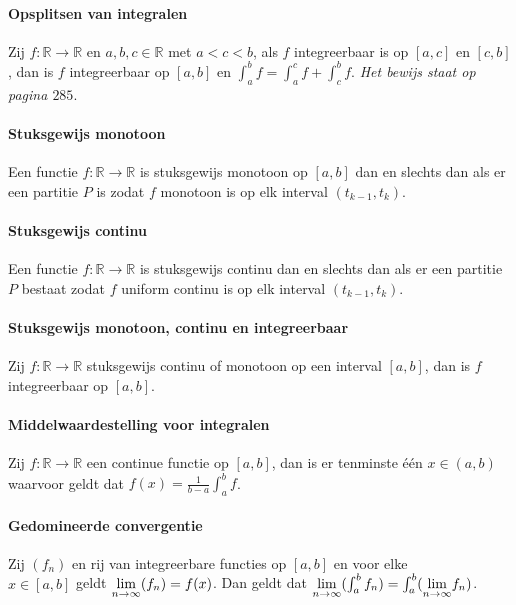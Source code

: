 \paragraph{Opsplitsen van integralen} Zij $f:\mathbb{R}\to\mathbb{R}$ en $a,b,c\in\mathbb{R}$ met $a<c<b$, als $f$ integreerbaar is op $[a,c]$ en $[c,b]$, dan is $f$ integreerbaar op $[a,b]$ en $\int_{a}^{b}f=\int_{a}^{c}f+\int_{c}^{b}f$. \textit{Het bewijs staat op pagina $285$}.

\paragraph{Stuksgewijs monotoon} Een functie $f:\mathbb{R}\to\mathbb{R}$ is stuksgewijs monotoon op $[a,b]$ dan en slechts dan als er een partitie $P$ is zodat $f$ monotoon is op elk interval $(t_{k-1},t_{k})$.

\paragraph{Stuksgewijs continu} Een functie $f:\mathbb{R}\to\mathbb{R}$ is stuksgewijs continu dan en slechts dan als er een partitie $P$ bestaat zodat $f$ uniform continu is op elk interval $(t_{k-1},t_{k})$.

\paragraph{Stuksgewijs monotoon, continu en integreerbaar} Zij $f:\mathbb{R}\to\mathbb{R}$ stuksgewijs continu of monotoon op een interval $[a,b]$, dan is $f$ integreerbaar op $[a,b]$.

\paragraph{Middelwaardestelling voor integralen} Zij $f:\mathbb{R}\to\mathbb{R}$ een continue functie op $[a,b]$, dan is er tenminste één $x\in(a,b)$ waarvoor geldt dat $f(x)=\frac{1}{b-a}\int_{a}^{b}f$.

\paragraph{Gedomineerde convergentie} Zij $(f_{n})$ en rij van integreerbare functies op $[a,b]$ en voor elke \\$x\in[a,b]$ geldt $\underset{n\to\infty}{\text{lim}}(f_{n})=f(x)$. Dan geldt dat $\underset{n\to\infty}{\text{lim}}(\int_{a}^{b}f_{n})=\int_{a}^{b}(\underset{n\to\infty}{\text{lim}}f_{n})$.
